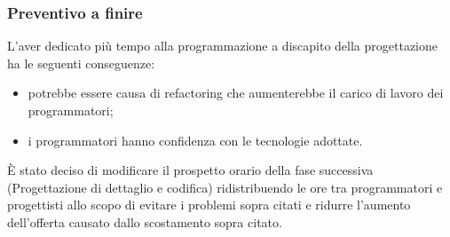 \subsubsection{Preventivo a finire}
L'aver dedicato più tempo alla programmazione a discapito della progettazione ha le seguenti conseguenze:
\begin{itemize}
    \item potrebbe essere causa di refactoring che aumenterebbe il carico di lavoro dei programmatori;
    \item i programmatori hanno confidenza con le tecnologie adottate.
\end{itemize}
È stato deciso di modificare il prospetto orario della fase successiva (Progettazione di dettaglio e codifica) ridistribuendo le ore tra programmatori e progettisti allo scopo di evitare i problemi sopra citati e ridurre l'aumento dell'offerta causato dallo scostamento sopra citato.

\def\salarycontent{
    {Amministratore,22,20,440},
    {Analista,0,25,0},
    {Progettista,$80+\noexpand\textbf{10}$,22,1980},
    {Programmatore,$137-\noexpand\textbf{17}$,15,1800},
    {Responsabile,15,30,450},
    {Verificatore,82,15,1230},
    {Totale,329,127,$5935-\noexpand\textbf{35} = 5900 $ },
}
